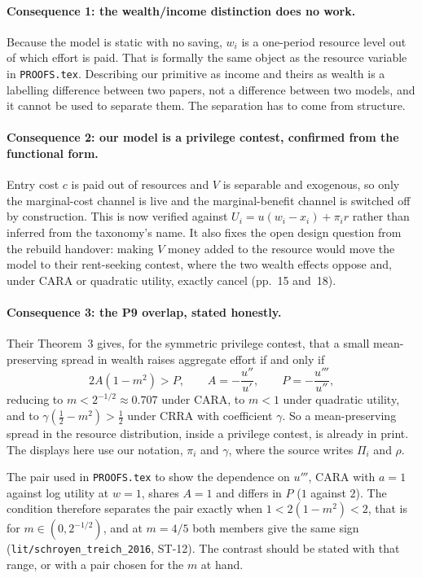 \documentclass[11pt,a4paper]{article}
\begin{document}
\paragraph{Consequence 1: the wealth/income distinction does no work.} Because
the model is static with no saving, $w_i$ is a one-period resource level out of
which effort is paid. That is formally the same object as the resource variable
in \texttt{PROOFS.tex}. Describing our primitive as income and theirs as wealth
is a labelling difference between two papers, not a difference between two
models, and it cannot be used to separate them. The separation has to come from
structure.

\paragraph{Consequence 2: our model is a privilege contest, confirmed from the
functional form.} Entry cost $c$ is paid out of resources and $V$ is separable
and exogenous, so only the marginal-cost channel is live and the
marginal-benefit channel is switched off by construction. This is now verified
against $U_i = u(w_i - x_i) + \pi_i r$ rather than inferred from the
taxonomy's name. It also fixes the open design question from the rebuild
handover: making $V$ money added to the resource would move the model to their
rent-seeking contest, where the two wealth effects oppose and, under CARA or
quadratic utility, exactly cancel (pp.~15 and~18).

\paragraph{Consequence 3: the P9 overlap, stated honestly.} Their Theorem~3
gives, for the symmetric privilege contest, that a small mean-preserving spread
in wealth raises aggregate effort if and only if
\[
  2A(1-m^2) > P, \qquad A = -\frac{u''}{u'}, \qquad P = -\frac{u'''}{u''},
\]
reducing to $m < 2^{-1/2} \approx 0.707$ under CARA, to $m < 1$ under quadratic
utility, and to $\gamma(\tfrac12 - m^2) > \tfrac12$ under CRRA with coefficient
$\gamma$. So a mean-preserving spread in the resource distribution, inside a
privilege contest, is already in print. The displays here use our notation,
$\pi_i$ and $\gamma$, where the source writes $\Pi_i$ and $\rho$.

The pair used in \texttt{PROOFS.tex} to show the dependence on $u'''$, CARA
with $a=1$ against log utility at $w=1$, shares $A=1$ and differs in $P$ ($1$
against $2$). The condition therefore separates the pair exactly when
$1 < 2(1-m^2) < 2$, that is for $m \in (0, 2^{-1/2})$, and at $m = 4/5$ both
members give the same sign (\texttt{lit/schroyen\_treich\_2016}, ST-12). The
contrast should be stated with that range, or with a pair chosen for the $m$
at hand.
\end{document}
